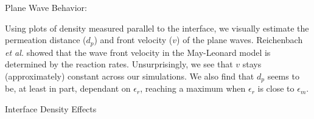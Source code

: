 \documentclass{beamer}
\begin{document}
\begin{frame}{}
\begin{textblock}{0.32}
\begin{block}{Plane Wave Behavior:}
\begin{center}
        \end{center}
        Using plots of density measured parallel to the interface, we visually
        estimate the permeation distance ($d_p$) and front velocity ($v$)
        of the plane waves. Reichenbach \textit{et al.} \cite{reichenbach08} showed
        that the wave front velocity in the May-Leonard model is determined by the 
        reaction rates. Unsurprisingly, we see that $v$ stays (approximately) constant across our simulations.
        We also find that $d_p$ seems to be, at least in part, dependant on $\epsilon_r$,
        reaching a maximum when $\epsilon_r$ is close to $\epsilon_m$. 
    \end{block}
    \begin{block}{Interface Density Effects}
        \begin{figure}[h]
            \centering
            \\

\end{figure}
\end{block}
\end{textblock}
\end{frame}
\end{document}
